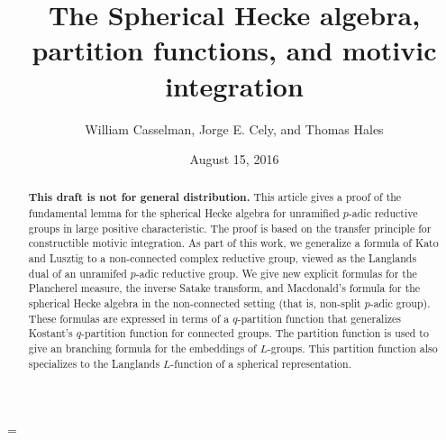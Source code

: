 \documentclass{amsart}
\theoremstyle{plain}
\theoremstyle{definition}
\theoremstyle{remark}
\numberwithin{equation}{subsection}
\begin{document}
\title
    {The Spherical Hecke algebra, partition functions, and motivic integration}
\author{William Casselman, Jorge E. Cely, and Thomas Hales}
\date{August 15, 2016}


\begin{abstract}  
{\bf This draft is not for general distribution.}   
This article gives a proof of the fundamental lemma for the spherical Hecke algebra
for unramified $p$-adic reductive groups in large positive characteristic.  The proof is based on the transfer principle
for constructible motivic integration.    
As part of this work, we generalize a formula of Kato and Lusztig 
to a non-connected complex reductive group, viewed as the Langlands dual of an unramifed $p$-adic reductive group.  
We give new explicit formulas for 
the Plancherel measure,  the inverse Satake transform, and Macdonald's formula for the spherical Hecke algebra in
the non-connected setting (that is, non-split $p$-adic group).  These formulas
are expressed in terms of a $q$-partition function that generalizes Kostant's $q$-partition function for connected groups.
The partition function is used to give an branching formula for the embeddings of $L$-groups. 
This partition function also specializes to the Langlands $L$-function of a spherical representation.
\end{abstract}


\parskip=\baselineskip

 \maketitle



    

      
      
       
      
      
\end{document}
